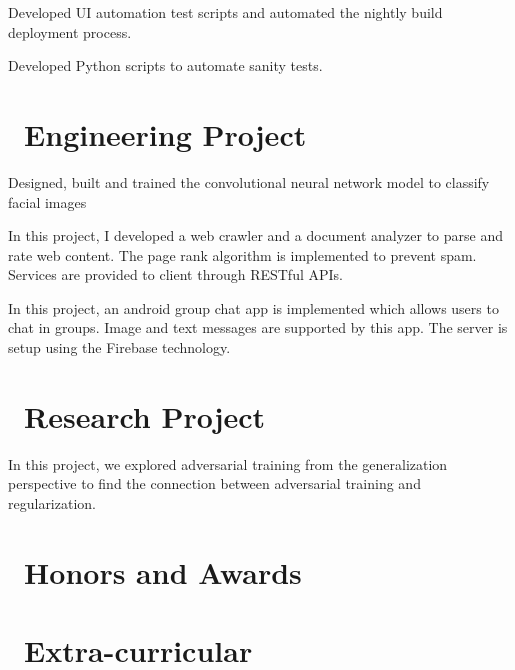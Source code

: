 \documentclass{resume}
\begin{document}
Developed UI automation test scripts and automated the nightly build deployment process.


Developed Python scripts to automate sanity tests.

\section{\faUsers\ Engineering Project}
Designed, built and trained the convolutional neural network model to classify facial images

In this project, I developed a web crawler and a document analyzer to parse and rate web content. The page rank algorithm is implemented to prevent spam. Services are provided to client through RESTful APIs.

In this project, an android group chat app is implemented which allows users to chat in groups. Image and text messages are supported by this app. The server is setup using the Firebase technology. 

\section{\faUsers\ Research Project}
In this project, we explored adversarial training from the generalization perspective to find the connection between adversarial training and regularization.

\section{\faHeartO\ Honors and Awards}

\section{\faInfo\ Extra-curricular}

%
%
\end{document}
